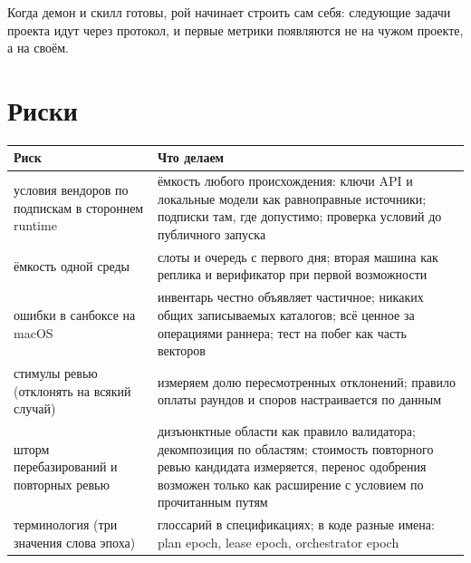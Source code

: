 Когда демон и скилл готовы, рой начинает строить сам себя: следующие задачи проекта идут через протокол, и первые метрики появляются не на чужом проекте, а на своём.

\section{Риски}

\begin{center}
\small
\begin{tabular}{p{4.6cm} p{8.8cm}}
\toprule
Риск & Что делаем \\
\midrule
условия вендоров по подпискам в стороннем runtime & ёмкость любого происхождения: ключи API и локальные модели как равноправные источники; подписки там, где допустимо; проверка условий до публичного запуска \\
ёмкость одной среды & слоты и очередь с первого дня; вторая машина как реплика и верификатор при первой возможности \\
ошибки в санбоксе на macOS & инвентарь честно объявляет частичное; никаких общих записываемых каталогов; всё ценное за операциями раннера; тест на побег как часть векторов \\
стимулы ревью (отклонять на всякий случай) & измеряем долю пересмотренных отклонений; правило оплаты раундов и споров настраивается по данным \\
шторм перебазирований и повторных ревью & дизъюнктные области как правило валидатора; декомпозиция по областям; стоимость повторного ревью кандидата измеряется, перенос одобрения возможен только как расширение с условием по прочитанным путям \\
терминология (три значения слова эпоха) & глоссарий в спецификациях; в коде разные имена: plan epoch, lease epoch, orchestrator epoch \\
\bottomrule
\end{tabular}
\end{center}
